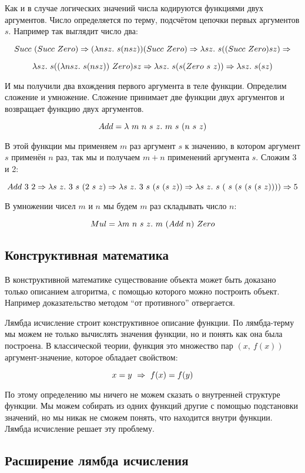 Как и в случае логических значений числа кодируются функциями двух
аргументов. Число определяется по терму, подсчётом цепочки первых
аргументов $s$. Например так выглядит число два:

\[Succ\ (Succ\ Zero) \Rightarrow (\lambda nsz .\  s(nsz)) (Succ\ Zero) 
    \Rightarrow \lambda sz .\  s((Succ\ Zero) sz) \Rightarrow\]

\[\lambda sz \D s((\lambda nsz \D s(nsz))\ Zero)sz \RA
   \lambda sz \D s (s(Zero\ s\ z)) \RA \lambda sz \D s(sz)\]

И мы получили два вхождения первого аргумента в теле функции. Определим
сложение и умножение. Сложение принимает две функции двух аргументов и
возвращает функцию двух аргументов.

\[Add = \lambda\ m\ n\ s\ z \D m\ s\ (n\ s\ z)\]

В этой функции мы применяем $m$ раз аргумент $s$ к значению, в котором
аргумент $s$ применён $n$ раз, так мы и получаем $m+n$ применений
аргумента $s$. Сложим 3 и 2:

\[Add\ 3\ 2 \RA \lambda s\ z \D 3\ s\ (2\ s\ z) 
    \RA \lambda s\ z \D 3\ s\ (s\ (s\ z)) 
    \RA \lambda s\ z \D s\ (\ s\ (s\ (s\ (s\ z)))) \RA 5\]

В умножении чисел $m$ и $n$ мы будем $m$ раз складывать число $n$:

\[Mul = \lambda m\ n\ s\ z \D m\ (Add\ n)\ Zero\]

\subsection{Конструктивная математика}

В конструктивной математике существование объекта может быть доказано
только описанием алгоритма, с помощью которого можно построить объект.
Например доказательство методом ``от противного'' отвергается.

Лямбда исчисление строит конструктивное описание функции. По
лямбда-терму мы можем не только вычислять значения функции, но и понять
как она была построена. В классической теории, функция это множество пар
$(x,\ f(x))$ аргумент-значение, которое обладает свойством:

\[x = y\ \Rightarrow\ f(x) = f(y)\]

По этому определению мы ничего не можем сказать о внутренней структуре
функции. Мы можем собирать из одних функций другие с помощью подстановки
значений, но мы никак не сможем понять, что находится внутри функции.
Лямбда исчисление решает эту проблему.

\subsection{Расширение лямбда исчисления}

